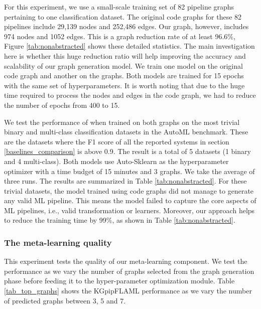 For this experiment, we use a small-scale training set of 82 pipeline graphs pertaining to one classification dataset. The original code graphs for these 82 pipelines include 29,139 nodes and 252,486 edges. Our {\GML} graph, however, includes 974 nodes and 1052 edges. This is a graph reduction rate of at least 96.6\%, Figure \ref{tab:nonabstracted} shows these detailed statistics. The main investigation here is whether this huge reduction ratio will help improving the accuracy and scalability of our graph generation model. We train one model on the original code graph and another on the {\GML} graphs. Both models are trained for 15 epochs with the same set of hyperparameters. It is worth noting that due to the huge time required to process the nodes and edges in the code graph, we had to reduce the number of epochs from 400 to 15.



We test the performance of {\sysname} when trained on both graphs on the most trivial binary and multi-class classification datasets in the AutoML benchmark. These are the  datasets where the F1 score of all the reported systems in section \ref{baselines_comparison} is above 0.9. The result is a total of 5 datasets (1 binary and 4 multi-class). Both models use Auto-Sklearn as the hyperparameter optimizer with a time budget of 15 minutes and 3 graphs. We take the average of three runs. The results are summarized in Table \ref{tab:nonabstracted}. For these trivial datasets, the model trained using code graphs did not manage to generate any valid ML pipeline. This means the model failed to capture the core aspects of ML pipelines, i.e., valid transformation or learners. Moreover, our {\GML} approach helps {\sysname} to reduce the training time by 99\%, as shown in Table \ref{tab:nonabstracted}. 





\subsubsection{The {\sysname} meta-learning quality}

This experiment tests the quality of our meta-learning component. We test the performance as we vary the number of graphs selected from the graph generation phase before feeding it to the hyper-parameter optimization module.  Table \ref{tab_top_graphs} shows the KGpipFLAML performance as we vary the number of predicted graphs between 3, 5 and 7. 

